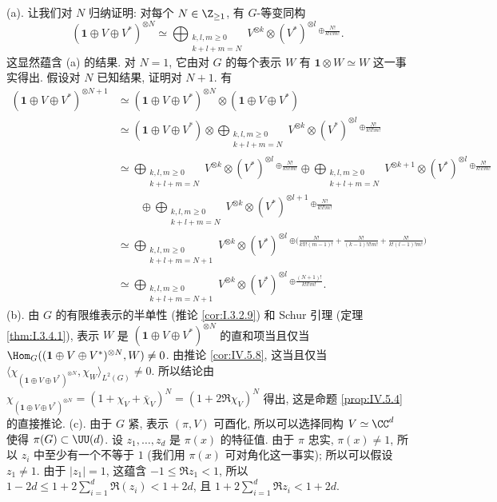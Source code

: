 \begin{solution}
(a). 让我们对 $N$ 归纳证明: 对每个 $N \in \Z_{\geq 1}$, 有 $G$-等变同构
\[
(\mathbf{1} \oplus V \oplus V^*)^{\otimes N} \simeq \bigoplus_{\substack{k,l,m \geq 0\\ k+l+m=N}}V^{\otimes k} \otimes (V^*)^{\otimes l}\,^{\oplus \frac{N!}{k!l!m!}}.
\]
这显然蕴含 (a) 的结果.
对 $N = 1$, 它由对 $G$ 的每个表示 $W$ 有 $\mathbf{1} \otimes W \simeq W$ 这一事实得出. 假设对 $N$ 已知结果, 证明对 $N+1$. 有
\begin{align*}
(\mathbf{1} \oplus V \oplus V^*)^{\otimes N+1} &\simeq (\mathbf{1} \oplus V \oplus V^*)^{\otimes N} \otimes (\mathbf{1} \oplus V \oplus V^*) \\
&\simeq (\mathbf{1} \oplus V \oplus V^*) \otimes \bigoplus_{\substack{k,l,m \geq 0\\ k+l+m=N}}V^{\otimes k} \otimes (V^*)^{\otimes l}\,^{\oplus \frac{N!}{k!l!m!}} \\
&\simeq \bigoplus_{\substack{k,l,m \geq 0\\ k+l+m=N}}V^{\otimes k} \otimes (V^*)^{\otimes l}\,^{\oplus \frac{N!}{k!l!m!}} \oplus \bigoplus_{\substack{k,l,m \geq 0\\ k+l+m=N}}V^{\otimes k+1} \otimes (V^*)^{\otimes l}\,^{\oplus \frac{N!}{k!l!m!}} \\
&\qquad \oplus \bigoplus_{\substack{k,l,m \geq 0\\ k+l+m=N}}V^{\otimes k} \otimes (V^*)^{\otimes l+1}\,^{\oplus \frac{N!}{k!l!m!}} \\
&\simeq \bigoplus_{\substack{k,l,m \geq 0\\ k+l+m=N+1}}V^{\otimes k} \otimes (V^*)^{\otimes l}\,^{\oplus \bigl(\frac{N!}{k!l!(m-1)!} + \frac{N!}{(k-1)!l!m!} + \frac{N!}{k!(l-1)!m!}\bigr)} \\
&\simeq \bigoplus_{\substack{k,l,m \geq 0\\ k+l+m=N+1}}V^{\otimes k} \otimes (V^*)^{\otimes l}\,^{\oplus \frac{(N+1)!}{k!l!m!}}.
\end{align*}
(b). 由 $G$ 的有限维表示的半单性 (推论 \ref{cor:I.3.2.9}) 和 Schur 引理 (定理 \ref{thm:I.3.4.1}), 表示 $W$ 是 $(\mathbf{1} \oplus V \oplus V^*)^{\otimes N}$ 的直和项当且仅当 $\Hom_G((\mathbf{1} \oplus V \oplus V^*)^{\otimes N}, W) \neq 0$. 由推论 \ref{cor:IV.5.8}, 这当且仅当 $\langle \chi_{(\mathbf{1} \oplus V \oplus V^*)^{\otimes N}}, \chi_W \rangle_{L^2(G)} \neq 0$. 所以结论由 $\chi_{(\mathbf{1} \oplus V \oplus V^*)^{\otimes N}} = (1 + \chi_V + \bar{\chi}_V)^N = (1 + 2\Re\chi_V)^N$ 得出, 这是命题 \ref{prop:IV.5.4} 的直接推论.
(c). 由于 $G$ 紧, 表示 $(\pi, V)$ 可酉化, 所以可以选择同构 $V \simeq \CC^d$ 使得 $\pi(G) \subset \UU(d)$. 设 $z_1, \ldots, z_d$ 是 $\pi(x)$ 的特征值. 由于 $\pi$ 忠实, $\pi(x) \neq 1$, 所以 $z_i$ 中至少有一个不等于 $1$ (我们用 $\pi(x)$ 可对角化这一事实); 所以可以假设 $z_1 \neq 1$. 由于 $|z_1| = 1$, 这蕴含 $-1 \leq \Re z_1 < 1$, 所以 $1 - 2d \leq 1 + 2\sum_{i=1}^d\Re(z_i) < 1 + 2d$, 且 $1 + 2\sum_{i=1}^d\Re z_i < 1 + 2d$.

\end{solution}
